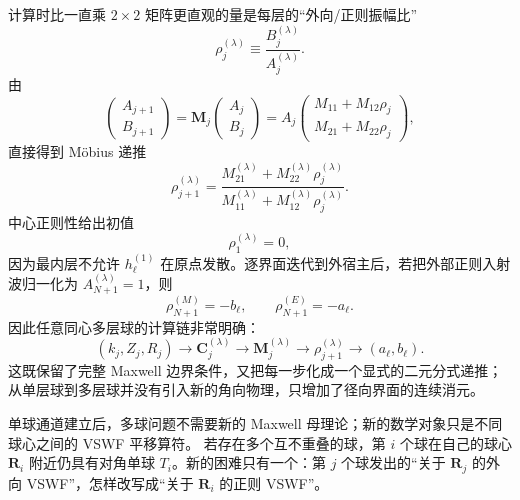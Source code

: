 计算时比一直乘 $2\times2$ 矩阵更直观的量是每层的“外向/正则振幅比”
\begin{equation}
\rho_j^{(\lambda)}
\equiv\frac{B_j^{(\lambda)}}{A_j^{(\lambda)}}.
\label{eq:multilayer-rho-def}
\end{equation}
由
\begin{equation}
\begin{pmatrix}A_{j+1}\\B_{j+1}\end{pmatrix}
=\mathbf M_j
\begin{pmatrix}A_j\\B_j\end{pmatrix}
=A_j
\begin{pmatrix}
M_{11}+M_{12}\rho_j\\
M_{21}+M_{22}\rho_j
\end{pmatrix},
\end{equation}
直接得到 Möbius 递推
\begin{equation}
\boxed{
\rho_{j+1}^{(\lambda)}
=\frac{M_{21}^{(\lambda)}+M_{22}^{(\lambda)}\rho_j^{(\lambda)}}
{M_{11}^{(\lambda)}+M_{12}^{(\lambda)}\rho_j^{(\lambda)}}.}
\label{eq:multilayer-Mobius}
\end{equation}
中心正则性给出初值
\begin{equation}
\rho_1^{(\lambda)}=0,
\end{equation}
因为最内层不允许 $h_\ell^{(1)}$ 在原点发散。逐界面迭代到外宿主后，若把外部正则入射波归一化为
$A_{N+1}^{(\lambda)}=1$，则
\begin{equation}
\rho_{N+1}^{(M)}=-b_\ell,
\qquad
\rho_{N+1}^{(E)}=-a_\ell.
\label{eq:multilayer-final-rho}
\end{equation}
因此任意同心多层球的计算链非常明确：
\begin{equation}
\boxed{
(k_j,Z_j,R_j)
\longrightarrow
\mathbf C_j^{(\lambda)}
\longrightarrow
\mathbf M_j^{(\lambda)}
\longrightarrow
\rho_{j+1}^{(\lambda)}
\longrightarrow
(a_\ell,b_\ell).}
\end{equation}
这既保留了完整 Maxwell 边界条件，又把每一步化成一个显式的二元分式递推；从单层球到多层球并没有引入新的角向物理，只增加了径向界面的连续消元。

单球通道建立后，多球问题不需要新的 Maxwell 母理论；新的数学对象只是不同球心之间的 VSWF 平移算符。
若存在多个互不重叠的球，第 $i$ 个球在自己的球心
$\bm R_i$ 附近仍具有对角单球 $T_i$。新的困难只有一个：第 $j$ 个球发出的“关于 $\bm R_j$ 的外向 VSWF”，怎样改写成“关于 $\bm R_i$ 的正则 VSWF”。

